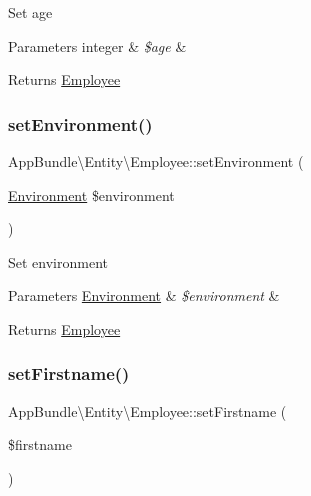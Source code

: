 Set age


\begin{DoxyParams}[1]{Parameters}
integer & {\em \$age} & \\
\hline
\end{DoxyParams}
\begin{DoxyReturn}{Returns}
\mbox{\hyperlink{class_app_bundle_1_1_entity_1_1_employee}{Employee}} 
\end{DoxyReturn}
\mbox{\label{class_app_bundle_1_1_entity_1_1_employee_abc7b0c40463197bd32bc452e9ffe4407}} 
\subsubsection{\texorpdfstring{set\+Environment()}{setEnvironment()}}
{\footnotesize\ttfamily App\+Bundle\textbackslash{}\+Entity\textbackslash{}\+Employee\+::set\+Environment (\begin{DoxyParamCaption}\item[{\mbox{\hyperlink{class_app_bundle_1_1_entity_1_1_environment}{Environment}}}]{\$environment }\end{DoxyParamCaption})}

Set environment


\begin{DoxyParams}[1]{Parameters}
\mbox{\hyperlink{class_app_bundle_1_1_entity_1_1_environment}{Environment}} & {\em \$environment} & \\
\hline
\end{DoxyParams}
\begin{DoxyReturn}{Returns}
\mbox{\hyperlink{class_app_bundle_1_1_entity_1_1_employee}{Employee}} 
\end{DoxyReturn}
\mbox{\label{class_app_bundle_1_1_entity_1_1_employee_a26c8846a99373bcfc48e48ba828ed638}} 
\subsubsection{\texorpdfstring{set\+Firstname()}{setFirstname()}}
{\footnotesize\ttfamily App\+Bundle\textbackslash{}\+Entity\textbackslash{}\+Employee\+::set\+Firstname (\begin{DoxyParamCaption}\item[{}]{\$firstname }\end{DoxyParamCaption})}

